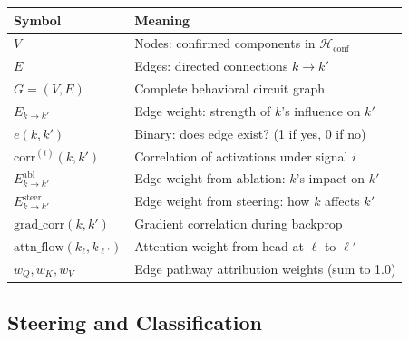 \documentclass[11pt]{article}
\begin{document}
\begin{center}
\begin{tabular}{ll}
\toprule
\textbf{Symbol} & \textbf{Meaning} \\
\midrule
$V$ & Nodes: confirmed components in $\mathcal{H}_{\text{conf}}$ \\
$E$ & Edges: directed connections $k \to k'$ \\
$G = (V, E)$ & Complete behavioral circuit graph \\
$E_{k \to k'}$ & Edge weight: strength of $k$'s influence on $k'$ \\
$e(k,k')$ & Binary: does edge exist? (1 if yes, 0 if no) \\
$\text{corr}^{(i)}(k,k')$ & Correlation of activations under signal $i$ \\
$E^{\text{abl}}_{k \to k'}$ & Edge weight from ablation: $k$'s impact on $k'$ \\
$E^{\text{steer}}_{k \to k'}$ & Edge weight from steering: how $k$ affects $k'$ \\
$\text{grad\_corr}(k,k')$ & Gradient correlation during backprop \\
$\text{attn\_flow}(k_\ell, k_{\ell'})$ & Attention weight from head at $\ell$ to $\ell'$ \\
$w_Q, w_K, w_V$ & Edge pathway attribution weights (sum to 1.0) \\
\bottomrule
\end{tabular}
\end{center}

\subsection{Steering and Classification}
\label{app:notation-steering-classification}
\end{document}
